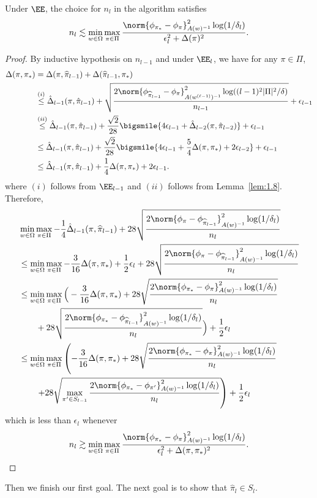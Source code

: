 \documentclass{article}
\newcommand{\kevin}[1]{\textcolor{red}{KGJ:#1}}
\newcommand{\pill}{\widehat{\pi}_{l-1}}
\newcommand{\1}{\mathbf{1}}
\begin{document}
\begin{lemma}\label{lem:C_44}
Under $\EE$, the choice for $n_l$ in the algorithm satisfies \[n_l\lesssim \min_{w\in\Omega}\max_{\pi\in\Pi}\frac{\norm{\phi_{\pi_*}-\phi_{\pi}}_{A(w)^{-1}}^2\log(1/\delta_l)}{\epsilon_l^2+\Delta(\pi)^2}.\]
\end{lemma}
\begin{proof}
By inductive hypothesis on $n_{l-1}$ and under $\EE_l$, we have for any $\pi\in\Pi$, 
\begin{align*}
    \Delta(\pi,\pi_*)&=\Delta(\pi,\pill)+\Delta(\pill,\pi_*)\\
    &\overset{(i)}{\leq} \hat{\Delta}_{l-1}(\pi,\hat{\pi}_{l-1})+\sqrt{\frac{2\norm{\phi_{\pill}-\phi_{\pi}}_{A(w^{(\ell-1)})^{-1}}^2\log((l-1)^2|\Pi|^2/\delta)}{n_{l-1}}}+\epsilon_{l-1}\\
    &\overset{(ii)}{\leq} \hat{\Delta}_{l-1}(\pi,\hat{\pi}_{l-1})+\frac{\sqrt{2}}{28}\bigsmile{4\epsilon_{l-1}+\hat{\Delta}_{l-2}(\pi,\hat{\pi}_{l-2})}+\epsilon_{l-1}\\
    &\leq \hat{\Delta}_{l-1}(\pi,\hat{\pi}_{l-1})+\frac{\sqrt{2}}{28}\bigsmile{4\epsilon_{l-1}+\frac{5}{4}\Delta(\pi,\pi_*)+2\epsilon_{l-2}}+\epsilon_{l-1}\\
    &\leq \hat{\Delta}_{l-1}(\pi,\hat{\pi}_{l-1})+\frac{1}{4}\Delta(\pi,\pi_*)+2\epsilon_{l-1}.
\end{align*}
where $(i)$ follows from $\EE_{l-1}$ and $(ii)$ follows from Lemma~\ref{lem:1.8}.
Therefore, 
\begin{align*}
    &\min_{w\in\Omega}\max_{\pi\in\Pi}-\frac{1}{4}\hat{\Delta}_{l-1}(\pi,\pill)+28\sqrt{\frac{2\norm{\phi_{\pi}-\phi_{\pill}}_{A(w)^{-1}}^2\log(1/\delta_l)}{n_l}}\\
    &\leq\min_{w\in\Omega}\max_{\pi\in\Pi}-\frac{3}{16}\Delta(\pi,\pi_*)+\frac{1}{2}\epsilon_l+28\sqrt{\frac{2\norm{\phi_{\pi}-\phi_{\pill}}_{A(w)^{-1}}^2\log(1/\delta_l)}{n_l}}\\
    &\leq\min_{w\in\Omega} \max_{\pi\in\Pi}\Big(-\frac{3}{16}\Delta(\pi,\pi_*)+28\sqrt{\frac{2\norm{\phi_{\pi_*}-\phi_\pi}_{A(w)^{-1}}^2\log(1/\delta_l)}{n_l}}\\
    &\qquad+28\sqrt{\frac{2\norm{\phi_{\pi_*}-\phi_{\pill}}_{A(w)^{-1}}^2\log(1/\delta_l)}{n_l}}\Big)+\frac{1}{2}\epsilon_l\\
    &\leq\min_{w\in\Omega} \max_{\pi\in\Pi}\left(-\frac{3}{16}\Delta(\pi,\pi_*)+28\sqrt{\frac{2\norm{\phi_{\pi_*}-\phi_\pi}_{A(w)^{-1}}^2\log(1/\delta_l)}{n_l}}\right.\\
    &\qquad\left.+28\sqrt{\max_{\pi'\in S_{l-1}}\frac{2\norm{\phi_{\pi_*}-\phi_{\pi'}}_{A(w)^{-1}}^2\log(1/\delta_l)}{n_l}}\right)+\frac{1}{2}\epsilon_l
\end{align*}
which is less than $\epsilon_l$
whenever
\[n_l\gtrsim\min_{w\in\Omega}\max_{\pi\in\Pi}\frac{\norm{\phi_{\pi_*}-\phi_{\pi}}_{A(w)^{-1}}^2\log(1/\delta_l)}{\epsilon_l^2+\Delta(\pi,\pi_*)^2}.\]
\end{proof}
Then we finish our first goal. The next goal is to show that $\hat{\pi}_l\in S_l$. 
\end{document}

